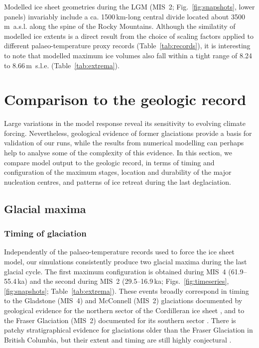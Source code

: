 \documentclass[tc]{copernicus}
\begin{document}
Modelled ice sheet geometries during the LGM (MIS~2; Fig.~\ref{fig:snapshots},
lower panels) invariably include a ca. 1500\,km-long central divide located
about 3500\,m~a.s.l. along the spine of the Rocky Mountains. Although the
similatity of modelled ice extents is a direct result from the choice of scaling
factors applied to different palaeo-temperature proxy records
(Table~\ref{tab:records}), it is interesting to note that modelled maximum ice
volumes also fall within a tight range of 8.24 to 8.66\,m~s.l.e.
(Table~\ref{tab:extrema}).


\section{Comparison to the geologic record}
\label{sec:discussion}

Large variations in the model response reveal its sensitivity to evolving
climate forcing. Nevertheless, geological evidence of former glaciations
provide a basis for validation of our runs, while the results from numerical
modelling can perhaps help to analyse some of the complexity of this evidence.
In this section, we compare model output to the geologic record, in terms of
timing and configuration of the maximum stages, location and durability of the
major nucleation centres, and patterns of ice retreat during the last
deglaciation.

\subsection{Glacial maxima}

\subsubsection{Timing of glaciation}
\label{sec:timing}

Independently of the palaeo-temperature records
used to force the ice sheet model, our simulations consistently produce two
glacial maxima during the last glacial cycle. The first maximum configuration
is obtained during MIS~4 (61.9--55.4\,ka) and the second during MIS~2
(29.5--16.9\,ka; Figs.~\ref{fig:timeseries}, \ref{fig:snapshots};
Table~\ref{tab:extrema}). These events broadly correspond in timing to the
Gladstone
(MIS~4) and McConnell (MIS~2) glaciations documented by geological evidence for
the northern sector of the Cordilleran ice sheet
    \citep{Duk-Rodkin.etal.1996, Ward.etal.2007,
           Stroeven.etal.2010, Stroeven.etal.2014},
and to the Fraser Glaciation (MIS~2) documented for its southern sector
    \citep{Porter.Swanson.1998, Margold.etal.2014}.
There is patchy stratigraphical evidence for glaciations older than the Fraser
Glaciation \citep{Clague.Ward.2011} in British Columbia, but their extent and
timing are still highly conjectural
    \citep[perhaps MIS~4 or early MIS~3; e.g.,][]{Cosma.etal.2008}.
\end{document}
